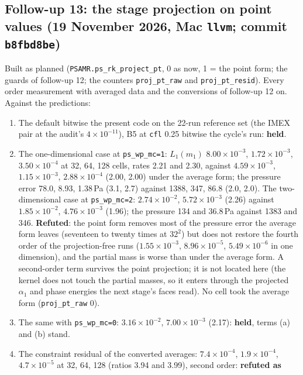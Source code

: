 \documentclass[11pt,a4paper]{article}
\newcommand{\code}[1]{\texttt{\small #1}}
\begin{document}
\subsection{Follow-up 13: the stage projection on point values (19 November 2026, Mac \code{llvm}; commit \code{b8fbd8be})}
\label{sec:fu13}

Built as planned (\code{PSAMR.ps\_rk\_project\_pt}, 0 as now, 1 = the
point form; the guards of follow-up 12; the counters
\code{proj\_pt\_raw} and \code{proj\_pt\_resid}).  Every order
measurement with averaged data and the conversions of follow-up 12 on.
Against the predictions:
\begin{enumerate}[nosep]
\item The default bitwise the present code on the 22-run reference set
      (the IMEX pair at the audit's $4\times10^{-11}$), B5 at \code{cfl}
      0.25 bitwise the cycle's run: \textbf{held}.
\item The one-dimensional case at \code{ps\_wp\_mc=1}: $L_1(m_1)$
      $8.00\times10^{-3}$, $1.72\times10^{-3}$, $3.50\times10^{-4}$ at
      32, 64, 128 cells, rates 2.21 and 2.30, against $4.59\times10^{-3}$,
      $1.15\times10^{-3}$, $2.88\times10^{-4}$ (2.00, 2.00) under the
      average form; the pressure error 78.0, 8.93, 1.38\,Pa (3.1, 2.7)
      against 1388, 347, 86.8 (2.0, 2.0).  The two-dimensional case at
      \code{ps\_wp\_mc=2}: $2.74\times10^{-2}$, $5.72\times10^{-3}$ (2.26)
      against $1.85\times10^{-2}$, $4.76\times10^{-3}$ (1.96); the
      pressure 134 and 36.8\,Pa against 1383 and 346.  \textbf{Refuted}:
      the point form removes most of the pressure error the average form
      leaves (seventeen to twenty times at $32^2$) but does not restore
      the fourth order of the projection-free runs ($1.55\times10^{-3}$,
      $8.96\times10^{-5}$, $5.49\times10^{-6}$ in one dimension), and the
      partial mass is worse than under the average form.  A second-order
      term survives the point projection; it is not located here (the
      kernel does not touch the partial masses, so it enters through the
      projected $\alpha_1$ and phase energies the next stage's faces
      read).  No cell took the average form (\code{proj\_pt\_raw} 0).
\item The same with \code{ps\_wp\_mc=0}: $3.16\times10^{-2}$,
      $7.00\times10^{-3}$ (2.17): \textbf{held}, terms (a) and (b) stand.
\item The constraint residual of the converted averages:
      $7.4\times10^{-4}$, $1.9\times10^{-4}$, $4.7\times10^{-5}$ at 32, 64,
      128 (ratios 3.94 and 3.99), second order: \textbf{refuted as
}
\end{enumerate}
\end{document}
